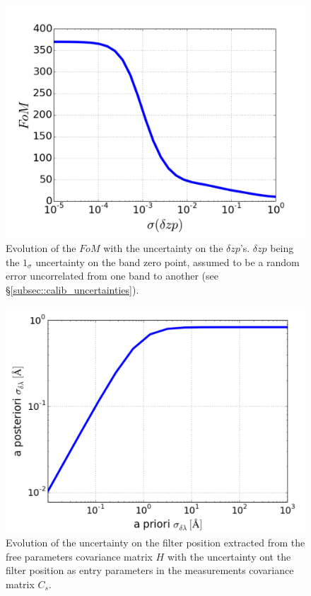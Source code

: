 \documentclass[\docopts]{\docclass}
\begin{document}
\begin{figure}[ht]
  \centering
  \includegraphics[width=\linewidth]{FoM_20k.pdf}
  \caption{Evolution of the $FoM$ with the uncertainty on the $\delta zp$'s. $\delta zp$ being the $1_\sigma$ uncertainty on the band zero point, assumed to be a random error uncorrelated from one band to another (see §\ref{subsec::calib_uncertainties}).}
  \label{fig:fom_zp}
\end{figure}

\begin{figure}[ht]
  \centering
  \includegraphics[width=\linewidth]{a_posteriori_sigmas.pdf}
  \caption{Evolution of the uncertainty on the filter position extracted from the free parameters covariance matrix $H$ with the uncertainty ont the filter position as entry parameters in the measurements covariance matrix $C_s$.}
  \label{fig:delta_lambda_ev}
\end{figure}
\end{document}
